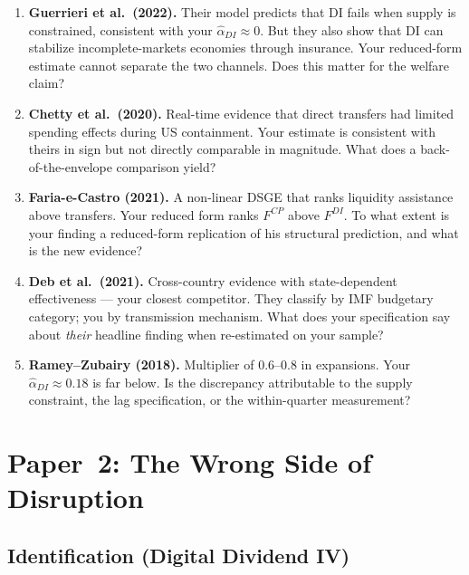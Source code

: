 \documentclass[11pt,a4paper]{article}
\begin{document}
\begin{enumerate}
\item \textbf{Guerrieri et al.\ (2022).} Their model predicts that DI fails when supply is constrained, consistent with your $\hat\alpha_{DI}\approx 0$. But they also show that DI can stabilize incomplete-markets economies through insurance. Your reduced-form estimate cannot separate the two channels. Does this matter for the welfare claim?

\item \textbf{Chetty et al.\ (2020).} Real-time evidence that direct transfers had limited spending effects during US containment. Your estimate is consistent with theirs in sign but not directly comparable in magnitude. What does a back-of-the-envelope comparison yield?

\item \textbf{Faria-e-Castro (2021).} A non-linear DSGE that ranks liquidity assistance above transfers. Your reduced form ranks $F^{CP}$ above $F^{DI}$. To what extent is your finding a reduced-form replication of his structural prediction, and what is the new evidence?

\item \textbf{Deb et al.\ (2021).} Cross-country evidence with state-dependent effectiveness — your closest competitor. They classify by IMF budgetary category; you by transmission mechanism. What does your specification say about \emph{their} headline finding when re-estimated on your sample?

\item \textbf{Ramey--Zubairy (2018).} Multiplier of 0.6--0.8 in expansions. Your $\hat\alpha_{DI}\approx 0.18$ is far below. Is the discrepancy attributable to the supply constraint, the lag specification, or the within-quarter measurement?
\end{enumerate}

\section{Paper~2: The Wrong Side of Disruption}

\subsection{Identification (Digital Dividend IV)}
\end{document}
